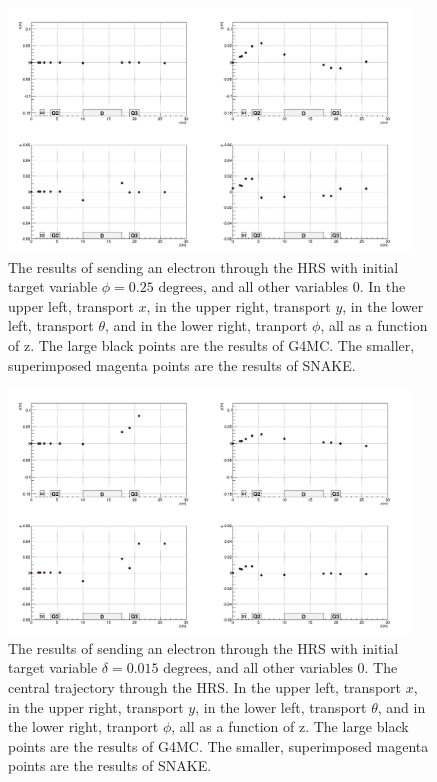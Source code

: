 \documentclass[11pt]{amsart}
\begin{document}
\begin{figure}
\begin{center}
\includegraphics[width=0.95\textwidth]{plots/pres_matrix_p_4.png}
\end{center}
\caption{The results of sending an electron through the HRS with initial target variable $\phi=0.25\text{ degrees}$, and all other variables 0. In the upper left, transport $x$, in the upper right, transport $y$, in the lower left, transport $\theta$, and in the lower right, tranport $\phi$, all as a function of z. The large black points are the results of G4MC. The smaller, superimposed magenta points are the results of SNAKE.}
\end{figure}

\begin{figure}
\begin{center}
\includegraphics[width=0.95\textwidth]{plots/pres_matrix_d_4.png}
\end{center}
\caption{The results of sending an electron through the HRS with initial target variable $\delta=0.015\text{ degrees}$, and all other variables 0. The central trajectory through the HRS. In the upper left, transport $x$, in the upper right, transport $y$, in the lower left, transport $\theta$, and in the lower right, tranport $\phi$, all as a function of z. The large black points are the results of G4MC. The smaller, superimposed magenta points are the results of SNAKE.}
\end{figure}
\FloatBarrier
\end{document}
